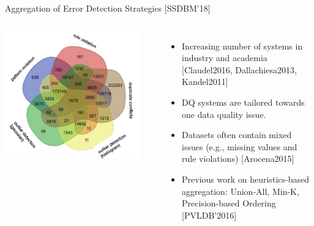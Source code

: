 \documentclass[aspectratio=169]{../latex_main/tntbeamer}  %
\begin{document}
\begin{frame}[c]{Aggregation of Error Detection Strategies [SSDBM’18]}

\begin{columns}

    
    \centering\includegraphics[width=0.9\textwidth]{figure/bild17_aggregation.png}



    \begin{itemize}
        \item Increasing number of systems in industry and academia [Claudel2016, Dallachiesa2013, Kandel2011]
        \item DQ systems are tailored towards one data quality issue.
        \item Datasets often contain mixed issues (e.g., missing values and rule violations) [Arocena2015]
        \item Previous work on heuristics-based aggregation: Union-All, Min-K, Precision-based Ordering [PVLDB'2016]
    \end{itemize}
    
\end{columns}


\end{frame}
\end{document}
